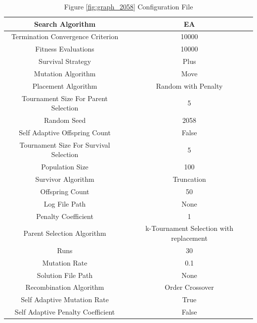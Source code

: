 \documentclass{standalone}
\begin{document}
\begin{table}[!htb]
	\centering
	\caption{Figure \ref{fig:graph_2058} Configuration File}
	\label{tab:graph_2058}
	\begin{tabular}{| c | c |}
		\hline
		Search Algorithm		& EA		 \\
		\hline
		Termination Convergence Criterion		& 10000		 \\
		\hline
		Fitness Evaluations		& 10000		 \\
		\hline
		Survival Strategy		& Plus		 \\
		\hline
		Mutation Algorithm		& Move		 \\
		\hline
		Placement Algorithm		& Random with Penalty		 \\
		\hline
		Tournament Size For Parent Selection		& 5		 \\
		\hline
		Random Seed		& 2058		 \\
		\hline
		Self Adaptive Offspring Count		& False		 \\
		\hline
		Tournament Size For Survival Selection		& 5		 \\
		\hline
		Population Size		& 100		 \\
		\hline
		Survivor Algorithm		& Truncation		 \\
		\hline
		Offspring Count		& 50		 \\
		\hline
		Log File Path		& None		 \\
		\hline
		Penalty Coefficient		& 1		 \\
		\hline
		Parent Selection Algorithm		& k-Tournament Selection with replacement		 \\
		\hline
		Runs		& 30		 \\
		\hline
		Mutation Rate		& 0.1		 \\
		\hline
		Solution File Path		& None		 \\
		\hline
		Recombination Algorithm		& Order Crossover		 \\
		\hline
		Self Adaptive Mutation Rate		& True		 \\
		\hline
		Self Adaptive Penalty Coefficient		& False		 \\
		\hline
	\end{tabular}
\end{table}
\end{document}
